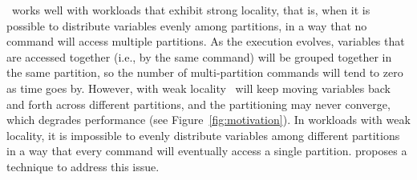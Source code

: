 \dssmr\ works well with workloads that exhibit strong locality, that is, when it is possible to distribute variables evenly among partitions, in a way that no command will access multiple partitions.
As the execution evolves, variables that are accessed together (i.e., by the same command) will be grouped together in the same partition, so the number of multi-partition commands will tend to zero as time goes by.
However, with weak locality \dssmr\ will keep moving variables back and forth across different partitions, and the partitioning may never converge, which degrades performance (see Figure~\ref{fig:motivation}).
%
In workloads with weak locality, it is impossible to evenly distribute variables among different partitions in a way that every command will eventually access a single partition.
\dynastar proposes a technique to address this issue.



